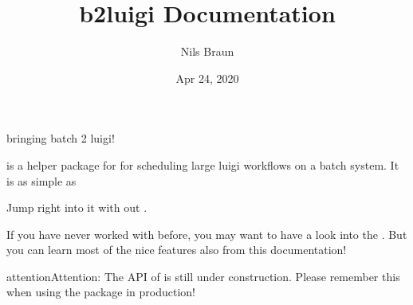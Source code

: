 \documentclass[letterpaper,10pt,english]{sphinxmanual}
\title{b2luigi Documentation}
\date{Apr 24, 2020}
\author{Nils Braun}
\begin{document}
\pagestyle{empty}
\sphinxmaketitle
\pagestyle{plain}
\sphinxtableofcontents
\pagestyle{normal}
\label{\detokenize{index::doc}}


 \sphinxhyphen{} bringing batch 2 luigi!

 is a helper package for   for scheduling large luigi workflows on a batch system.
It is as simple as

\begin{sphinxVerbatim}[commandchars=\\\{\}]
 


 
     
         

     
           


   
     
\end{sphinxVerbatim}

Jump right into it with out {\hyperref[\detokenize{usage/quickstart:quick-start-label}]{}}.

If you have never worked with  before, you may want to have a look into the .
But you can learn most of the nice features also from this documentation!

\begin{sphinxadmonition}{attention}{Attention:}
The API of  is still under construction.
Please remember this when using the package in production!
\end{sphinxadmonition}
\end{document}
